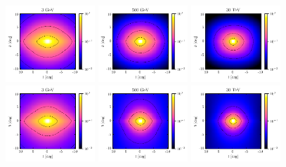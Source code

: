\documentclass[doublespace,nopageskip]{VTthesis}
\begin{document}
\begin{figure}[htb]
    \centering
    \includegraphics[width=0.3\textwidth]{Figures/IC_MSPs/skymap_bulge_3gev.pdf}
    \includegraphics[width=0.3\textwidth]{Figures/IC_MSPs/skymap_bulge_500gev.pdf}
    \includegraphics[width=0.3\textwidth]{Figures/IC_MSPs/skymap_bulge_30tev.pdf}
    \includegraphics[width=0.3\textwidth]{Figures/IC_MSPs/skymap_nfw_3gev.pdf}
    \includegraphics[width=0.3\textwidth]{Figures/IC_MSPs/skymap_nfw_500gev.pdf}
    \includegraphics[width=0.3\textwidth]{Figures/IC_MSPs/skymap_nfw_30tev.pdf}

\end{figure}
\end{document}
